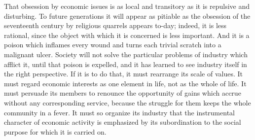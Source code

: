 \documentclass{book}
\begin{document}
That obsession by economic issues is as local and transitory as it is repulsive and disturbing. To future generations it will appear as pitiable as the obsession of the seventeenth century by religious quarrels appears to-day; indeed, it is less rational, since the object with which it is concerned is less important. And it is a poison which inflames every wound and turns each trivial scratch into a malignant ulcer. Society will not solve the particular problems of industry which afflict it, until that poison is expelled, and it has learned to see industry itself in the right perspective. If it is to do that, it must rearrange its scale of values. It must regard economic interests as one element in life, not as the whole of life. It must persuade its members to renounce the opportunity of gains which accrue without any corresponding service, because the struggle for them keeps the whole community in a fever. It must so organize its industry that the instrumental character of economic activity is emphasized by its subordination to the social purpose for which it is carried on.
\end{document}
